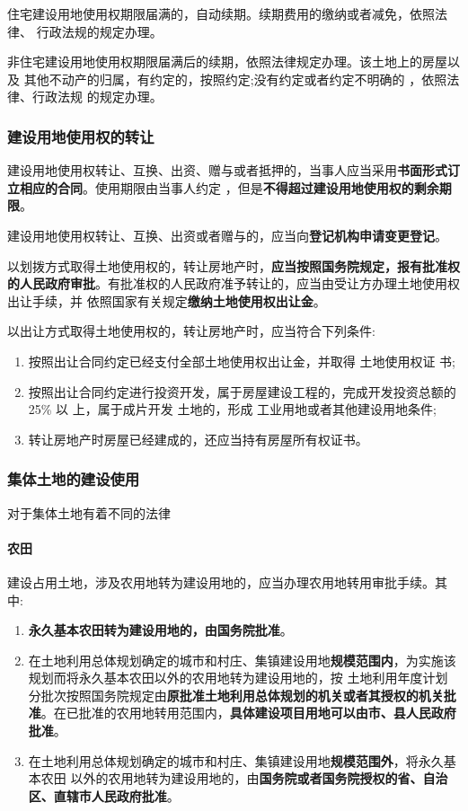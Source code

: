 \documentclass[UTF8,12pt]{ctexart}
\numberwithin{equation}{section} %
\numberwithin{figure}{section}
\numberwithin{table}{section}
\begin{document}
	 
	住宅建设用地使用权期限届满的，自动续期。续期费用的缴纳或者减免，依照法律、 行政法规的规定办理。
	
	非住宅建设用地使用权期限届满后的续期，依照法律规定办理。该土地上的房屋以及 其他不动产的归属，有约定的，按照约定;没有约定或者约定不明确的 ，依照法律、行政法规 的规定办理。
	
	\subsubsection{建设用地使用权的转让}
	建设用地使用权转让、互换、出资、赠与或者抵押的，当事人应当采用\textbf{书面形式订立相应的合同}。使用期限由当事人约定 ，但是\textbf{不得超过建设用地使用权的剩余期限}。
	
	建设用地使用权转让、互换、出资或者赠与的，应当向\textbf{登记机构申请变更登记}。
	
	以划拨方式取得土地使用权的，转让房地产时，\textbf{应当按照国务院规定，报有批准权的人民政府审批}。有批准权的人民政府准予转让的，应当由受让方办理土地使用权出让手续，并 依照国家有关规定\textbf{缴纳土地使用权出让金}。
	
	以出让方式取得土地使用权的，转让房地产时，应当符合下列条件:
	\begin{enumerate}
		\item 按照出让合同约定已经支付全部土地使用权出让金，并取得 土地使用权证 书;
		
		\item 按照出让合同约定进行投资开发，属于房屋建设工程的，完成开发投资总额的25\% 以 上，属于成片开发 土地的，形成 工业用地或者其他建设用地条件; 
		
		\item 转让房地产时房屋已经建成的，还应当持有房屋所有权证书。
	\end{enumerate}
	
	
	\subsubsection{集体土地的建设使用}
	对于集体土地有着不同的法律
	\paragraph{农田}
	建设占用土地，涉及农用地转为建设用地的，应当办理农用地转用审批手续。其中:
	\begin{enumerate}
		\item \textbf{永久基本农田转为建设用地的，由国务院批准}。
		
		\item 在土地利用总体规划确定的城市和村庄、集镇建设用地\textbf{规模范围内}，为实施该规划而将永久基本农田以外的农用地转为建设用地的，按 土地利用年度计划分批次按照国务院规定由\textbf{原批准土地利用总体规划的机关或者其授权的机关批准}。在已批准的农用地转用范围内，\textbf{具体建设项目用地可以由市、县人民政府批准}。
		
		\item 在土地利用总体规划确定的城市和村庄、集镇建设用地\textbf{规模范围外}，将永久基本农田 以外的农用地转为建设用地的，由\textbf{国务院或者国务院授权的省、自治区、直辖市人民政府批准}。
	\end{enumerate}
	
\end{document}
